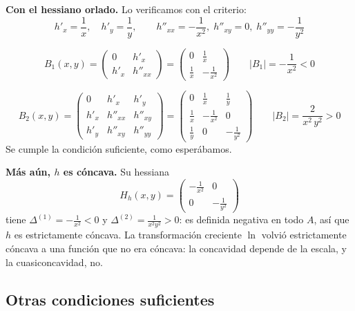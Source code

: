 \documentclass{article}
\begin{document}
\medskip

\noindent\textbf{Con el hessiano orlado.} Lo verificamos con el criterio:
\[
h'_x=\frac1x,\quad h'_y=\frac1y,
\qquad
h''_{xx}=-\frac1{x^2},\;h''_{xy}=0,\;h''_{yy}=-\frac1{y^2}
\]

\[
B_1(x,y)
=\begin{pmatrix}
0 & h'_x\\[4pt]
h'_x & h''_{xx}
\end{pmatrix}
=
\begin{pmatrix}
0 & \tfrac1x\\[4pt]
\tfrac1x & -\tfrac1{x^2}
\end{pmatrix}
\qquad
|B_1|=-\frac1{x^2}<0
\]

\[
B_2(x,y)
=\begin{pmatrix}
0      & h'_x       & h'_y\\[4pt]
h'_x    & h''_{xx}    & h''_{xy}\\[4pt]
h'_y    & h''_{xy}    & h''_{yy}
\end{pmatrix}
=
\begin{pmatrix}
0      & \tfrac1x       & \tfrac1y\\[4pt]
\tfrac1x & -\tfrac1{x^2} & 0\\[4pt]
\tfrac1y & 0             & -\tfrac1{y^2}
\end{pmatrix}
\qquad
|B_2|=\frac{2}{x^2\,y^2}>0
\]
Se cumple la condición suficiente, como esperábamos.

\medskip

\noindent\textbf{Más aún, \(h\) es cóncava.} Su hessiana
\[
H_h(x,y)=\begin{pmatrix}-\tfrac1{x^2}&0\\[4pt]0&-\tfrac1{y^2}\end{pmatrix}
\]
tiene \(\Delta^{(1)}=-\tfrac1{x^2}<0\) y \(\Delta^{(2)}=\tfrac1{x^2y^2}>0\): es definida negativa en todo \(A\), así que \(h\) es estrictamente cóncava. La transformación creciente \(\ln\) volvió estrictamente cóncava a una función que no era cóncava: la concavidad depende de la escala, y la cuasiconcavidad, no.

\medskip


\subsection*{Otras condiciones suficientes}
\end{document}
